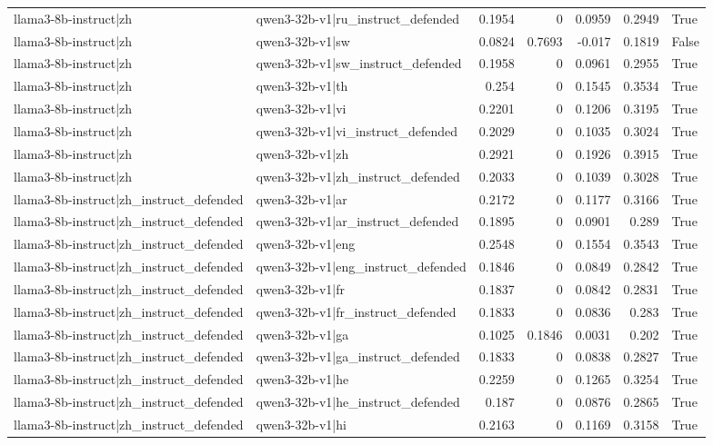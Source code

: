 \begin{table}
\begin{tabular}{l l r r r r l}
llama3-8b-instruct|zh & qwen3-32b-v1|ru_instruct_defended & 0.1954 & 0 & 0.0959 & 0.2949 & True \\
llama3-8b-instruct|zh & qwen3-32b-v1|sw & 0.0824 & 0.7693 & -0.017 & 0.1819 & False \\
llama3-8b-instruct|zh & qwen3-32b-v1|sw_instruct_defended & 0.1958 & 0 & 0.0961 & 0.2955 & True \\
llama3-8b-instruct|zh & qwen3-32b-v1|th & 0.254 & 0 & 0.1545 & 0.3534 & True \\
llama3-8b-instruct|zh & qwen3-32b-v1|vi & 0.2201 & 0 & 0.1206 & 0.3195 & True \\
llama3-8b-instruct|zh & qwen3-32b-v1|vi_instruct_defended & 0.2029 & 0 & 0.1035 & 0.3024 & True \\
llama3-8b-instruct|zh & qwen3-32b-v1|zh & 0.2921 & 0 & 0.1926 & 0.3915 & True \\
llama3-8b-instruct|zh & qwen3-32b-v1|zh_instruct_defended & 0.2033 & 0 & 0.1039 & 0.3028 & True \\
llama3-8b-instruct|zh_instruct_defended & qwen3-32b-v1|ar & 0.2172 & 0 & 0.1177 & 0.3166 & True \\
llama3-8b-instruct|zh_instruct_defended & qwen3-32b-v1|ar_instruct_defended & 0.1895 & 0 & 0.0901 & 0.289 & True \\
llama3-8b-instruct|zh_instruct_defended & qwen3-32b-v1|eng & 0.2548 & 0 & 0.1554 & 0.3543 & True \\
llama3-8b-instruct|zh_instruct_defended & qwen3-32b-v1|eng_instruct_defended & 0.1846 & 0 & 0.0849 & 0.2842 & True \\
llama3-8b-instruct|zh_instruct_defended & qwen3-32b-v1|fr & 0.1837 & 0 & 0.0842 & 0.2831 & True \\
llama3-8b-instruct|zh_instruct_defended & qwen3-32b-v1|fr_instruct_defended & 0.1833 & 0 & 0.0836 & 0.283 & True \\
llama3-8b-instruct|zh_instruct_defended & qwen3-32b-v1|ga & 0.1025 & 0.1846 & 0.0031 & 0.202 & True \\
llama3-8b-instruct|zh_instruct_defended & qwen3-32b-v1|ga_instruct_defended & 0.1833 & 0 & 0.0838 & 0.2827 & True \\
llama3-8b-instruct|zh_instruct_defended & qwen3-32b-v1|he & 0.2259 & 0 & 0.1265 & 0.3254 & True \\
llama3-8b-instruct|zh_instruct_defended & qwen3-32b-v1|he_instruct_defended & 0.187 & 0 & 0.0876 & 0.2865 & True \\
llama3-8b-instruct|zh_instruct_defended & qwen3-32b-v1|hi & 0.2163 & 0 & 0.1169 & 0.3158 & True \\

\end{tabular}
\end{table}
